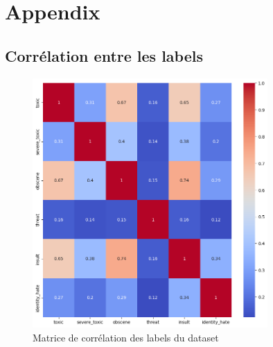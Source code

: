 
\chapter{Appendix}
\label{chap:appendix}

\section{Corrélation entre les labels}
\begin{figure}[h]
    \centering
    \includegraphics[width=0.8\textwidth]{figures/matrice-correlation.png}
    \caption{Matrice de corrélation des labels du dataset}
\end{figure}

\newpage
